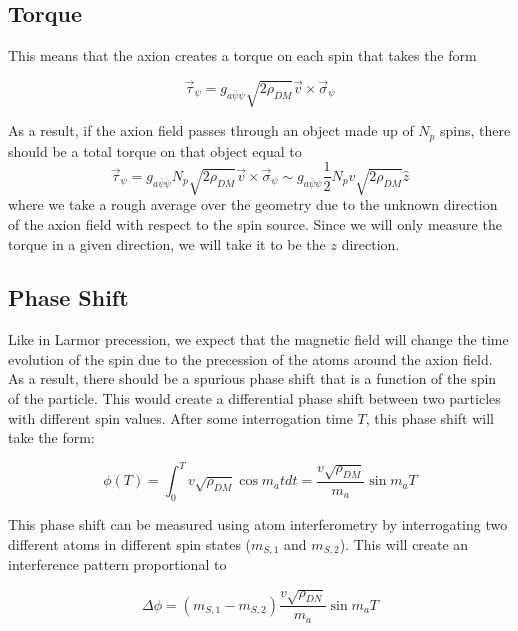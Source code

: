 \documentclass[aps,prd,final,letterpaper]{revtex4}
\newcommand{\coupling}{g_{a\bar{\psi}\psi}}
\begin{document}
\subsection{Torque}

This means that the axion creates a torque on each spin that takes the form 

\begin{equation}
\vec{\tau}_{\psi} = \coupling\sqrt{2\rho_{DM}}\vec{v} \times \vec{\sigma}_{\psi}
\end{equation}

As a result, if the axion field passes through an object made up of $N_p$ spins, there should be a total torque on that object equal to
\begin{equation}
\vec{\tau}_{\psi} = \coupling N_p\sqrt{2\rho_{DM}}\vec{v} \times \vec{\sigma}_{\psi} \sim \coupling\frac{1}{2}N_p v\sqrt{2\rho_{DM}} \hat{z}
\label{signal}
\end{equation}
where we take a rough average over the geometry due to the unknown direction of the axion field with respect to the spin source. Since we will only measure the torque in a given direction, we will take it to be the $z$ direction.

\subsection{Phase Shift}

Like in Larmor precession, we expect that the magnetic field will change the time evolution of the spin due to the precession of the atoms around the axion field. As a result, there should be a spurious phase shift that is a function of the spin of the particle. This would create a differential phase shift between two particles with different spin values. After some interrogation time $T$, this phase shift will take the form:

\begin{equation}
\phi(T) = \int_0^T v\sqrt{\rho_{DM}}\cos{m_at}dt = \frac{v\sqrt{\rho_{DM}}}{m_a}\sin{m_a T}
\end{equation}

This phase shift can be measured using atom interferometry by interrogating two different atoms in different spin states ($m_{S, 1}$ and $m_{S, 2}$). This will create an interference pattern proportional to 

\begin{equation}
\Delta\phi = (m_{S, 1} - m_{S, 2})\frac{v\sqrt{\rho_{DN}}}{m_a}\sin{m_a T}
\end{equation}
\end{document}
